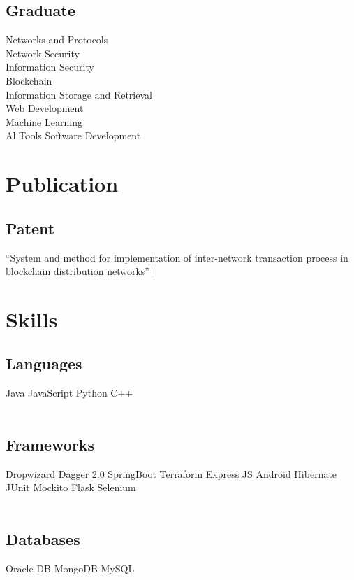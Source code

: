 \documentclass[]{resume-openfont}
\begin{document}
\begin{minipage}[t]{0.33\textwidth}
\subsection{Graduate}
Networks and Protocols \\
Network Security \\
Information Security \\
Blockchain \\
Information Storage and Retrieval \\
Web Development \\
Machine Learning \\
Al Tools Software Development \\
\sectionsep

\section{Publication}
\subsection{Patent}
“System and method for implementation of inter-network transaction process in blockchain distribution networks”  | \href{https://patentscope.wipo.int/search/en/detail.jsf?docId=IN326376132}{\faLink}



\section{Skills}
\subsection{Languages}
Java \textbullet{}   JavaScript \textbullet{} Python \textbullet{} C++ \\~\\
\subsection{Frameworks}
Dropwizard \textbullet{} Dagger 2.0 \textbullet{} SpringBoot \textbullet{} Terraform \textbullet{} Express JS \textbullet{} Android \textbullet{} Hibernate \textbullet{} JUnit \textbullet{} Mockito \textbullet{} Flask \textbullet{} Selenium \\~\\
\subsection{Databases}
Oracle DB \textbullet{} MongoDB \textbullet{} MySQL \\~\\

\end{minipage}
\end{document}
